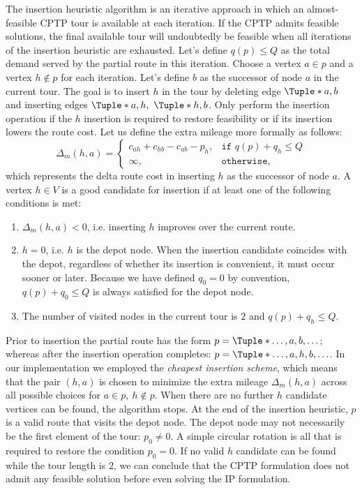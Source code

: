 The insertion heuristic algorithm is an iterative approach
in which an almost-feasible CPTP tour is available at each iteration.
If the CPTP admits feasible solutions,
the final available tour will undoubtedly be feasible
when all iterations of the insertion heuristic are exhausted.
Let's define $q(p) \le Q$ as the total demand served
by the partial route in this iteration.
Choose a vertex $a \in p$ and a vertex $h \notin p$ for each iteration.
Let's define $b$ as the successor of node $a$ in the current tour.
The goal is to insert $h$ in the tour
by deleting edge $\Tuple*{a, b}$
and inserting edges $\Tuple*{a, h},\ \Tuple*{h, b}$.
Only perform the insertion operation if the $h$ insertion
is required to restore feasibility or if its insertion lowers the route cost.
Let us define the extra mileage more formally as follows:
\begin{equation}
	\Delta_m(h, a) =
	\begin{cases}
		c_{ah} + c_{hb} - c_{ab} - p_h, & \texttt{if } q(p) + q_h \le Q \\
		\infty,                         & \texttt{otherwise},
	\end{cases}
\end{equation}
which represents the delta route cost in inserting $h$ as the successor of node $a$.
A vertex $h \in V$ is a good candidate for insertion
if at least one of the following conditions is met:
\begin{enumerate}
	\item $\Delta_m(h, a) < 0$, i.e. inserting $h$ improves over the current route.
	\item $h = 0$, i.e. $h$ is the depot node.
	      When the insertion candidate coincides with the depot,
	      regardless of whether its insertion is convenient, it must occur sooner or later.
	      Because we have defined $q_0 = 0$ by convention,
	      $q(p) + q_0 \le Q$ is always satisfied for the depot node.
	\item The number of visited nodes in the current tour is $2$ and $q(p) + q_h \le Q$.
\end{enumerate}

Prior to insertion the partial route has the form $p = \Tuple*{\dots, a, b, \dots}$;
whereas after the insertion operation completes: $p = \Tuple*{\dots, a, h, b, \dots}$.
In our implementation we employed the \textit{cheapest insertion scheme},
which means that the pair $(h, a)$ is chosen to minimize the extra mileage $\Delta_m(h, a)$
across all possible choices for $a \in p,\ h \notin p$.
When there are no further $h$ candidate vertices can be found, the algorithm stops.
At the end of the insertion heuristic, $p$ is a valid route that visits the depot node.
The depot node may not necessarily be the first element of the tour: $p_0 \ne 0$.
A simple circular rotation is all that is required to restore the condition $p_0 = 0$.
If no valid $h$ candidate can be found while the tour length is $2$,
we can conclude that the CPTP formulation does not admit any feasible solution
before even solving the IP formulation.

